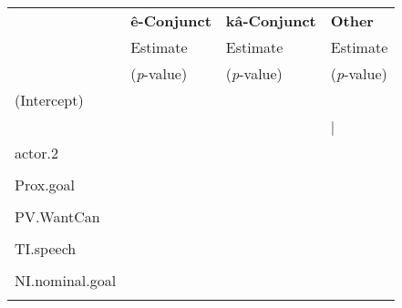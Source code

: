                     \begin{table}[H]
                    \centering
                    \begin{tabular}{llll}
                    \toprule
                                & \textbf{ê-Conjunct}   & \textbf{kâ-Conjunct}  & \textbf{Other} \\
                                & Estimate     & Estimate     & Estimate\\
                                & (\textit{p}-value) & (\textit{p}-value) & (\textit{p}-value) \\
                    \midrule
(Intercept)            & \cellcolor[HTML]{B6D7A8}{1.468}       & \cellcolor[HTML]{EA9999}{-2.361} & \cellcolor[HTML]{EA9999}{-2.652} \\
                       & \cellcolor[HTML]{B6D7A8}{($<$ 0.001)} & \cellcolor[HTML]{EA9999}{($<$ 0.001)}                      & \cellcolor[HTML]{EA9999}{($<$ 0.001)}|     \\
actor.2                & \cellcolor[HTML]{EA9999}{-1.21}       &                                  & \cellcolor[HTML]{B6D7A8}{1.847}  \\
                       & \cellcolor[HTML]{EA9999}{($<$ 0.001)} &                                  & \cellcolor[HTML]{B6D7A8}{($<$ 0.001)}      \\
Prox.goal              & \cellcolor[HTML]{EA9999}{-1.039}      & \cellcolor[HTML]{B6D7A8}{0.898}  &        \\
                       & \cellcolor[HTML]{EA9999}{($<$ 0.001)} & \cellcolor[HTML]{B6D7A8}{(0.001)}                          &        \\
PV.WantCan             & \cellcolor[HTML]{EA9999}{-1.031}      & \cellcolor[HTML]{B6D7A8}{1.365}  &        \\
                       & \cellcolor[HTML]{EA9999}{(0.003)}     & \cellcolor[HTML]{B6D7A8}{($<$ 0.001)}                      &        \\
TI.speech              & \cellcolor[HTML]{EA9999}{-0.776}      & \cellcolor[HTML]{B6D7A8}{0.817}  &        \\
                       & \cellcolor[HTML]{EA9999}{(0.024)}     & \cellcolor[HTML]{B6D7A8}{(0.021)}                          &        \\
NI.nominal.goal        & \cellcolor[HTML]{EA9999}{-0.753}      &                                  & \cellcolor[HTML]{B6D7A8}{0.86}   \\
                       & \cellcolor[HTML]{EA9999}{(0.007)}     &                                  & \cellcolor[HTML]{B6D7A8}{(0.013)}  \\

\end{tabular}
\end{table}
